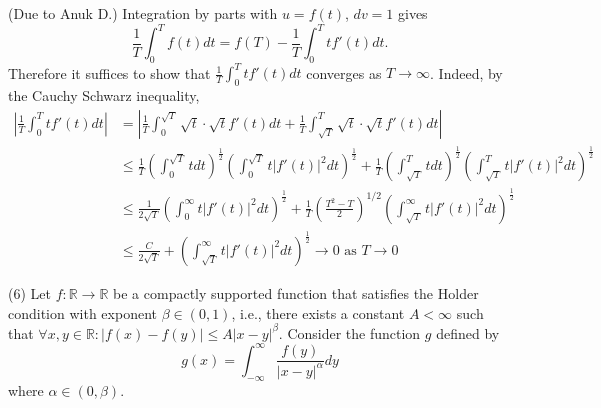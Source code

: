 \documentclass[answers]{exam}
\theoremstyle{problemstyle}
\newcommand{\1}[1]{\textbf{1}_{\left[#1\right]}} %
\def\R{\mathbb{R}} %
\begin{document}
\begin{questions}
\begin{solution}
(Due to Anuk D.) Integration by parts with $u=f(t)$, $dv=1$ gives
\begin{equation*}
  \frac{1}{T}\int_{0}^{T}f(t)dt = f(T) - \frac{1}{T}\int_{0}^{T}tf'(t)dt.
\end{equation*}
Therefore it suffices to show that $\frac{1}{T}\int_{0}^{T}tf'(t)dt$ converges as $T\to \infty$. Indeed, by the Cauchy Schwarz inequality,
\begin{align*}
  \left|\frac{1}{T}\int_{0}^{T}tf'(t)dt\right|
  &= \left|\frac{1}{T}\int_{0}^{\sqrt{T}}\sqrt{t}\cdot\sqrt{t}f'(t)dt + \frac{1}{T}\int_{\sqrt{T}}^{T}\sqrt{t}\cdot \sqrt{t}f'(t)dt\right|\\
  & \leq \frac{1}{T}\left(\int_{0}^{\sqrt{T}}t dt \right)^{\frac{1}{2}}\left( \int_{0}^{\sqrt{T}}t |f'(t)|^{2}dt \right)^{\frac{1}{2}}+ \frac{1}{T}\left( \int_{\sqrt{T}}^{T}tdt \right)^{\frac{1}{2}}\left( \int_{\sqrt{T}}^{T}t|f'(t)|^{2}dt \right)^{\frac{1}{2}}\\
  &\leq \frac{1}{2 \sqrt{T}} \left(\int_{0}^{\infty}t|f'(t)|^{2} dt \right)^{\frac{1}{2}} + \frac{1}{T}\left( \frac{T^{2}-T}{2} \right)^{1/2}\left(\int_{\sqrt{T}}^{\infty}t|f'(t)|^{2}dt \right)^{\frac{1}{2}}\\
  &\leq \frac{C}{2 \sqrt{T}}  +\left(\int_{\sqrt{T}}^{\infty} t|f'(t)|^{2}dt \right)^{\frac{1}{2}} \to 0 \text{ as }T\to 0
\end{align*}
\end{solution}


\question (6) Let $f: \R\to\R$ be a compactly supported function that satisfies the Holder condition with exponent $\beta\in (0,1)$, i.e., there exists a constant $A<\infty$ such that $\forall x,y\in \R: |f(x)-f(y)|\leq A|x-y|^{\beta}$. Consider the function $g$ defined by
\begin{equation*}
g(x) = \int_{-\infty}^{\infty} \frac{f(y)}{|x-y|^{\alpha}} dy
\end{equation*}
where $\alpha \in (0,\beta).$
\begin{parts}

\end{parts}
\end{questions}
\end{document}
